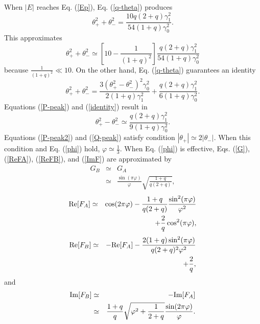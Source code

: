 \documentclass{jpsj3}
\begin{document}
When $|E|$ reaches Eq. (\ref{Ep}), Eq. (\ref{q-theta}) 
produces
\begin{equation}
\theta_+^2+\theta_-^2=\frac{10q(2+q)\gamma_1^2}{54(1+q)\gamma_0^2}.
\label{P-peak2}
\end{equation}
This approximates
\begin{equation}
\theta_+^2+\theta_-^2
\simeq \left[
10-\frac{1}{(1+q)^2}
\right] \frac{q(2+q)\gamma_1^2}{54(1+q)\gamma_0^2}
\label{P-peak}
\end{equation}
because $\frac{1}{(1+q)^2} \ll 10$.
On the other hand, Eq. (\ref{q-theta})
guarantees an identity 
\begin{equation}
\theta_+^2+\theta_-^2
=\frac{3(\theta_+^2-\theta_-^2)^2\gamma_0^2}{2(1+q)\gamma_1^2}
+\frac{q(2+q)\gamma_1^2}{6(1+q)\gamma_0^2}.
\label{identity}
\end{equation}
Equations (\ref{P-peak}) and (\ref{identity}) result in
\begin{equation}
\theta_+^2-\theta_-^2
\simeq \frac{q(2+q)\gamma_1^2}{9(1+q)\gamma_0^2}.
\label{Q-peak}
\end{equation}
Equations (\ref{P-peak2}) and (\ref{Q-peak})
satisfy condition $|\theta_+| \simeq 2|\theta_-|$.
When this condition and Eq. (\ref{phi})
hold, $\varphi \simeq \frac{1}{3}$.
When Eq. (\ref{phi}) is effective, Eqs. (\ref{G}),
(\ref{ReFA}), (\ref{ReFB}), and (\ref{ImF})
are approximated by 
\begin{eqnarray}
G_B & \simeq & G_A \label{GB=GA} \\
& \simeq & \frac{\sin(\pi\varphi)}{\varphi}\sqrt{\frac{1+q}{q(2+q)}},
\label{phi-G} 
\end{eqnarray}
\begin{eqnarray}
{\rm Re} [F_A] & \simeq & \cos(2\pi\varphi)
-\frac{1+q}{q(2+q)}\frac{\sin^2(\pi\varphi)}{\varphi^2} \nonumber \\
& & +\frac{2}{q}\cos^2(\pi\varphi),
\label{phi-FA} 
\end{eqnarray}
\begin{eqnarray}
{\rm Re} [F_B] & \simeq & - {\rm Re} [F_A]
-\frac{2(1+q)\sin^2(\pi\varphi)}{q(2+q)^2\varphi^2} \nonumber \\
& & +\frac{2}{q},
\label{phi-FB} 
\end{eqnarray}
and 
\begin{eqnarray}
{\rm Im} [F_B]
&\simeq & -{\rm Im} [F_A] \label{phi-ImF2} \\
&\simeq & 
\frac{1+q}{q}\sqrt{\varphi^2+\frac{1}{2+q}}
\frac{\sin(2\pi\varphi)}{\varphi}.
\label{phi-ImF} 
\end{eqnarray}
\end{document}
